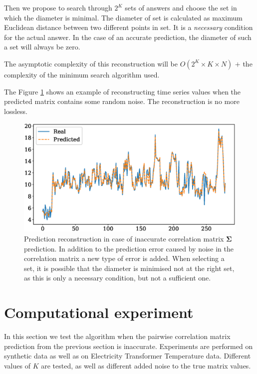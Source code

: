 \documentclass[12pt]{article}
\begin{document}
{Then we propose to search through $2^K$ sets of answers and choose the set in which the diameter is minimal. The diameter of set is calculated as maximum Euclidean distance between two different points in set. It is a \emph{necessary} condition for the actual answer. In the case of an accurate prediction, the diameter of such a set will always be zero.

The asymptotic complexity of this reconstruction will be $O(2^K \times K \times N)$ $+$ the complexity of the minimum search algorithm used.

The Figure \ref{fig:fig4} shows an example of reconstructing time series values when the predicted matrix contains some random noise. The reconstruction is no more lossless.

\begin{figure}[!htbp]
	\centering
	\includegraphics[width=\textwidth]{NonIdealRecovery.eps}
	\caption{Prediction reconstruction in case of inaccurate correlation matrix $\mathbf{\Sigma}$ prediction. In addition to the prediction error caused by noise in the correlation matrix a new type of error is added. When selecting a set, it is possible that the diameter is minimised not at the right set, as this is only a necessary condition, but not a sufficient one.}
	\label{fig:fig4}
\end{figure}

\section{Computational experiment}

In this section we test the algorithm when the pairwise correlation matrix prediction from the previous section is inaccurate. Experiments are performed on synthetic data as well as on Electricity Transformer Temperature \cite{haoyietal-informer-2021} data. Different values of $K$ are tested, as well as different added noise to the true matrix values.

}
\end{document}
